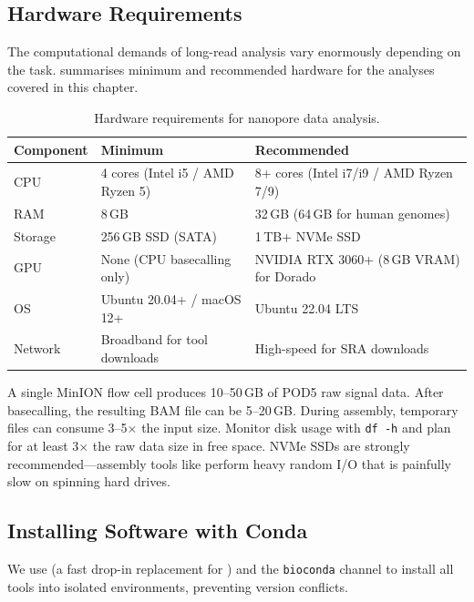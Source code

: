 \subsection{Hardware Requirements}
\label{subsec:diyanalysis:hardware}

The computational demands of long-read analysis vary enormously depending on the task.  summarises minimum and recommended hardware for the analyses covered in this chapter.

\begin{table}[htbp]
\centering
\caption{Hardware requirements for nanopore data analysis.}
\label{tab:diy_hardware}
\begin{tabularx}{\textwidth}{@{}lXX@{}}
\toprule
\textbf{Component} & \textbf{Minimum} & \textbf{Recommended} \\
\midrule
CPU & 4 cores (Intel i5 / AMD Ryzen 5) & 8+ cores (Intel i7/i9 / AMD Ryzen 7/9) \\
RAM & 8\,GB & 32\,GB (64\,GB for human genomes) \\
Storage & 256\,GB SSD (SATA) & 1\,TB+ NVMe SSD \\
GPU & None (CPU basecalling only) & NVIDIA RTX 3060+ (8\,GB VRAM) for Dorado \\
OS & Ubuntu 20.04+ / macOS 12+ & Ubuntu 22.04 LTS \\
Network & Broadband for tool downloads & High-speed for SRA downloads \\
\bottomrule
\end{tabularx}
\end{table}

\begin{warningbox}[title={Storage Fills Up Fast}]
A single MinION flow cell produces 10--50\,GB of POD5 raw signal data. After basecalling, the resulting \acrshort{BAM} file can be 5--20\,GB. During assembly, temporary files can consume 3--5$\times$ the input size. Monitor disk usage with \texttt{df -h} and plan for at least 3$\times$ the raw data size in free space. NVMe SSDs are strongly recommended---assembly tools like  perform heavy random I/O that is painfully slow on spinning hard drives.
\end{warningbox}

\subsection{Installing Software with Conda}
\label{subsec:diyanalysis:conda}

We use  (a fast drop-in replacement for ) and the \texttt{bioconda} channel to install all tools into isolated environments, preventing version conflicts.

